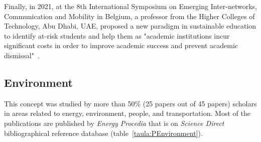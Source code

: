 \documentclass[a4paper,12pt,twoside]{ThesisStyle}
\begin{document}
Finally, in 2021, at the 8th International Symposium on Emerging Inter-networks, Communication and Mobility in Belgium, a professor from the Higher Colleges of Technology, Abu Dhabi, UAE, proposed a new paradigm in sustainable education to identify at-risk students and help them as "academic institutions incur significant costs in order to improve academic success and prevent academic dismissal"~\cite{embarak2021new}.

\subsection{Environment}

This concept was studied by more than 50\% (25 papers out of 45 papers) scholars in areas related to energy, environment, people, and transportation.
Most of the publications are published by \textit{Energy Procedia} that is on \textit{Science Direct} bibliographical reference database (table~\ref{taula:PEnvironment}). 
\end{document}
